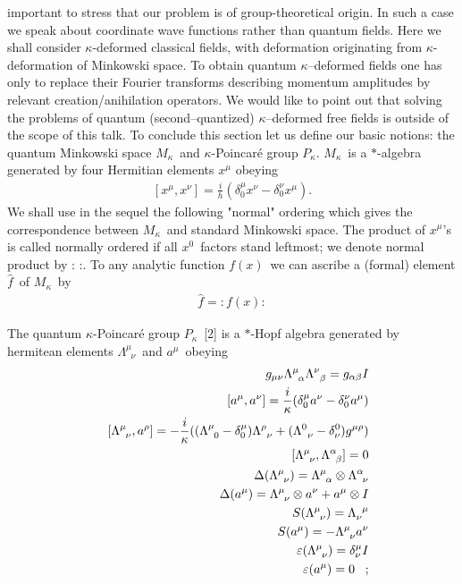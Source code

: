 \documentclass[a4paper,a4paper]{article}
\begin{document}
important to stress that our problem is of group-theoretical
origin. In such a case we speak about coordinate wave functions
rather than quantum fields. Here we shall consider
$\kappa$-deformed classical fields, with deformation originating
from $\kappa$-deformation of Minkowski space.
 To obtain quantum
$\kappa$--deformed  fields one has only to replace their Fourier
transforms describing momentum amplitudes by relevant
creation/anihilation operators. We would like to point out that
 solving
the problems of quantum (second--quantized) $\kappa$--deformed
free fields is outside of the scope of this talk.
\newline To conclude this section let us define our basic
notions: the quantum Minkowski space $M_{\kappa}$\ and
$\kappa$-Poincar\'{e} group $P_{\kappa}$.
\newline
$M_{\kappa}$\ is a $*$-algebra generated by four Hermitian elements
$x^{\mu}$%
obeying
\begin{eqnarray}\label{wz1}
[x^{\mu},x^{\nu}]=\frac{i}{h}(\delta_{0}^{\mu}x^{\nu} -
\delta_{0}^{\nu}x^{\mu}).
\nonumber
\end{eqnarray}
We shall use in the sequel the following "normal" ordering which
gives the correspondence between $M_{\kappa}$\ and standard
Minkowski space. The product of $x^{\mu}$'s is called normally
ordered if all $x^{0}$\ factors stand leftmost; we denote normal
product by : :. To any analytic
 function $%
f(x)$\ we can ascribe a (formal) element $\hat{f}$\ of $M_{\kappa}$\
by
\begin{eqnarray}\label{wz2}
\hat{f}=: f(x):  \nonumber
\end{eqnarray}

The quantum $\kappa$-Poincar\'{e} group $P_{\kappa}$\ [2] is a
$*$-Hopf algebra generated by hermitean elements
$\Lambda^{\mu}_{\;\;\nu}$\ and $a^{\mu}$\ obeying
\begin{eqnarray}\label{wz3}
&&g_{\mu \nu}\Lambda_{\;\;\alpha}^{\mu}\Lambda_{\;\;\beta}^{\nu}=g_{\alpha
\beta}I
\nonumber \\
&&[a^{\mu},a^{\nu}]=\frac{i}{\kappa}(\delta_{0}^{\mu}a^{\nu}-
\delta_{0}^{%
\nu}a^{\mu})  \nonumber \\
&&[\Lambda_{\;\;\nu}^{\mu},a^{\rho}]=-\frac{i}{\kappa}((\Lambda_{\;\;0}^{\mu}-
%
\delta_{0}^{\mu})\Lambda^{\rho}_{\;\;\nu}
+(\Lambda_{\;\;\nu}^{0}-\delta_{\nu}^{0})g^{\mu \rho})  \nonumber \\
&&[\Lambda_{\;\;\nu}^{\mu},\Lambda_{\;\;\beta}^{\alpha}]=0  \nonumber \\
&&\Delta(\Lambda_{\;\;\nu}^{\mu})=\Lambda_{\;\;\alpha}^{\mu}\otimes
\Lambda_{\;\;\nu}^{\alpha}  \nonumber \\
&&\Delta(a^{\mu})=\Lambda_{\;\;\nu}^{\mu}\otimes a^{\nu}+a^{\mu}\otimes I
\nonumber \\
&&S(\Lambda_{\;\;\nu}^{\mu})=\Lambda_{\nu}^{\;\;\mu}  \nonumber \\
&&S(a^{\mu})=-\Lambda_{\;\;\nu}^{\mu}a^{\nu}  \nonumber \\
&&\varepsilon(\Lambda^{\mu}_{\;\;\nu})=\delta^{\mu}_{\nu}I  \nonumber \\
&&\varepsilon(a^{\mu})=0\;\;\;;  \nonumber
\end{eqnarray}
\end{document}
